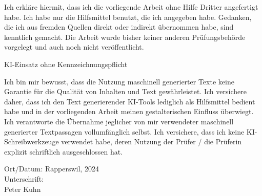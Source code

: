 

Ich erkläre hiermit, dass ich die vorliegende Arbeit ohne Hilfe Dritter angefertigt habe. Ich habe nur die Hilfsmittel benutzt, die ich angegeben habe. Gedanken, die ich aus fremden Quellen direkt oder indirekt übernommen habe, sind kenntlich gemacht. Die Arbeit wurde bisher keiner anderen Prüfungsbehörde vorgelegt und auch noch nicht veröffentlicht.

KI-Einsatz ohne Kennzeichnungspflicht

Ich bin mir bewusst, dass die Nutzung maschinell generierter Texte keine Garantie für die Qualität von Inhalten und Text gewährleistet. Ich versichere daher, dass ich den Text generierender KI-Tools lediglich als Hilfsmittel bedient habe und in der vorliegenden Arbeit meinen gestalterischen Einfluss überwiegt. Ich verantworte die Übernahme jeglicher von mir verwendeter maschinell generierter Textpassagen vollumfänglich selbst. Ich versichere, dass ich keine KI-Schreibwerkzeuge verwendet habe, deren Nutzung der Prüfer / die Prüferin explizit schriftlich ausgeschlossen hat.



Ort/Datum: Rapperswil, 2024 \\
Unterschrift:\\
Peter Kuhn
